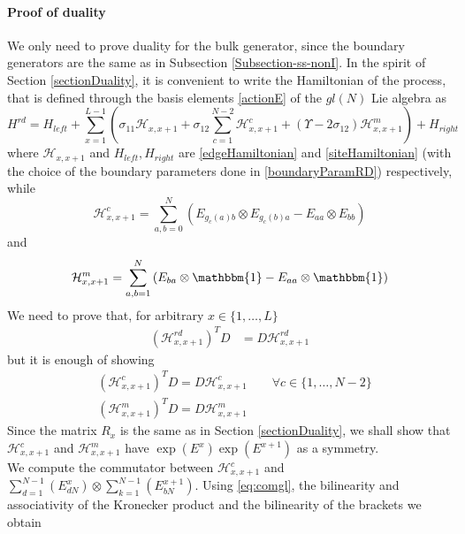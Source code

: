 \documentclass[10pt]{article}
\numberwithin{equation}{section}
\numberwithin{equation}{subsection}
\begin{document}
\paragraph{Proof of duality}
We only need to prove duality for the bulk generator, since the boundary generators are the same as in Subsection \ref{Subsection-ss-nonI}. 
In the spirit of Section \ref{sectionDuality}, it is convenient to write the Hamiltonian of the process, that is defined through the basis elements \eqref{actionE} of the $gl(N)$ Lie algebra as 
\begin{equation}
	H^{rd}=H_{left}+\sum_{x=1}^{L-1}\left(\sigma_{11}\mathcal{H}_{x,x+1}+\sigma_{12}\sum_{c=1}^{N-2}\mathcal{H}_{x,x+1}^{c}+(\Upsilon-2\sigma_{12})\mathcal{H}_{x,x+1}^{m}\right)+H_{right}
\end{equation}
where $\mathcal{H}_{x,x+1}$ and $H_{left},H_{right}$ are \eqref{edgeHamiltonian}  and \eqref{siteHamiltonian} (with the choice of the boundary parameters done in \eqref{boundaryParamRD}) respectively, while
\begin{equation}
	\mathcal{H}_{x,x+1}^{c}=\sum_{a,b=0}^{N}\left(E_{g_{c}(a)b}\otimes E_{g_{c}(b)a}-E_{aa}\otimes E_{bb}\right)
\end{equation}
and 
\begin{equation}
	\mathcal{H}_{x,x+1}^{m}=\sum_{a,b=1}^{N}\left(E_{ba}\otimes \mathbbm{1}-E_{aa}\otimes \mathbbm{1}\right)
\end{equation}
We need to prove that, for arbitrary $x\in\{1,\ldots,L\}$
\begin{align}
	(\mathcal{H}_{x,x+1}^{rd})^{T}D&=D\mathcal{H}_{x,x+1}^{rd}\label{edgeDualityRelationRD}
\end{align}
but it is enough of showing 
\begin{align}
	&(\mathcal{H}_{x,x+1}^{c})^{T}D=D\mathcal{H}_{x,x+1}^{c}\qquad \forall c\in \{1,\ldots,N-2\}\label{cDualityRelation}\\
	&(\mathcal{H}_{x,x+1}^{m})^{T}D=D\mathcal{H}_{x,x+1}^{m}\label{mDualityRelation}
\end{align}
Since the matrix $R_{x}$ is the same as in Section \ref{sectionDuality}, we shall show that $\mathcal{H}_{x,x+1}^{c}$ and $\mathcal{H}_{x,x+1}^{m}$ have $\exp{(E^{x})}\exp{(E^{x+1})}$ as a symmetry. \\
 We compute the commutator between $\mathcal{H}_{x,x+1}^{c}$ and $\sum_{d=1}^{N-1}(E_{dN}^{x})\otimes \sum_{k=1}^{N-1}(E_{bN}^{x+1})$. Using \eqref{eq:comgl}, the bilinearity and associativity of the Kronecker product and the bilinearity of the brackets we obtain 
\end{document}
